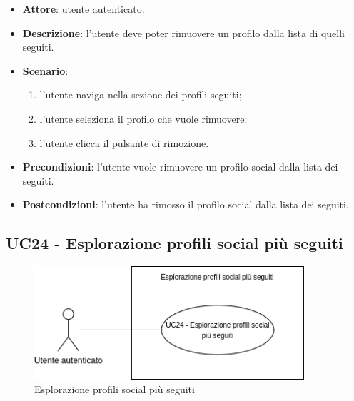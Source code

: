 \begin{itemize}
    \item \textbf{Attore}: utente autenticato.
    \item \textbf{Descrizione}: l'utente deve poter rimuovere un profilo dalla lista di quelli seguiti.
    \item \textbf{Scenario}:
    \begin{enumerate}
        \item l'utente naviga nella sezione dei profili seguiti;
        \item l'utente seleziona il profilo che vuole rimuovere;
        \item l'utente clicca il pulsante di rimozione.
    \end{enumerate}

    \item \textbf{Precondizioni}: l'utente vuole rimuovere un profilo social dalla lista dei seguiti.
    \item \textbf{Postcondizioni}: l'utente ha rimosso il profilo social dalla lista dei seguiti.
\end{itemize}

\subsection{UC24 - Esplorazione profili social più seguiti}

\begin{figure}[!h]
    \includegraphics[width=10cm]{sezioni/Images/UC24.png}
    \centering
    \caption{Esplorazione profili social più seguiti}
\end{figure}

